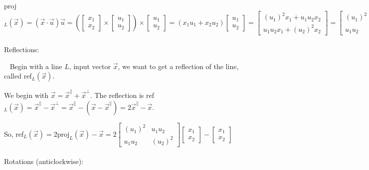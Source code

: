 \documentclass[11pt]{article}
\begin{document}
proj$_L(\vec{x})=(\vec{x}\cdot\vec{u})\vec{u}=\left(\begin{bmatrix}x_1\\x_2\end{bmatrix}\times\begin{bmatrix}u_1\\u_2\end{bmatrix}\right)\times\begin{bmatrix}u_1\\u_2\end{bmatrix}=(x_1u_1+x_2u_2)\begin{bmatrix}u_1\\u_2\end{bmatrix}=\begin{bmatrix}(u_1)^2x_1+u_1u_2x_2\\u_1u_2x_1+(u_2)^2x_2\end{bmatrix}=\begin{bmatrix}(u_1)^2 & u_1u_2\\u_1u_2 & (u_2)^2\end{bmatrix}\begin{bmatrix}x_1\\x_2\end{bmatrix}$\\\\

Reflections:

$\,\,\,$ Begin with a line $L$, input vector $\vec{x}$, we want to get a reflection of the line, called ref$_L(\vec{x})$.

We begin with $\vec{x}=\vec{x}^\parallel+\vec{x}^\perp$. The reflection is ref$_L(\vec{x})=\vec{x}^\parallel-\vec{x}^\perp=\vec{x}^\parallel-(\vec{x}-\vec{x}^\parallel)=2\vec{x}^\parallel -\vec{x}$.

So, ref$_L(\vec{x})=2\text{proj}_L(\vec{x})-\vec{x}=2\begin{bmatrix}(u_1)^2 & u_1u_2\\u_1u_2 & (u_2)^2\end{bmatrix}\begin{bmatrix}x_1\\x_2\end{bmatrix}-\begin{bmatrix}x_1\\x_2\end{bmatrix}$\\\\

Rotations (anticlockwise):
\end{document}
